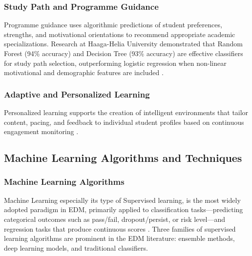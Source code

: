 \documentclass[12pt]{report}
\begin{document}
\subsubsection{Study Path and Programme Guidance}
Programme guidance uses algorithmic predictions of student preferences,
strengths, and motivational orientations to recommend appropriate academic
specializations. Research at Haaga-Helia University demonstrated that
Random Forest (94\% accuracy) and Decision Tree (93\% accuracy) are
effective classifiers for study path selection, outperforming logistic
regression when non-linear motivational and demographic features are
included \parencite{Dirin2022}.

\subsubsection{Adaptive and Personalized Learning}
Personalized learning supports the creation of intelligent environments
that tailor content, pacing, and feedback to individual student profiles
based on continuous engagement monitoring \parencite{kwakye2025}.

\subsection{Machine Learning Algorithms and Techniques}

\subsubsection{Machine Learning Algorithms}
Machine Learning especially its type of Supervised learning,
is the most widely adopted paradigm in EDM,
primarily applied to classification tasks---predicting categorical
outcomes such as pass/fail, dropout/persist, or risk level---and
regression tasks that produce continuous scores \parencite{bello2025,
Dirin2022}. Three families of supervised learning algorithms are
prominent in the EDM literature: ensemble methods, deep learning
models, and traditional classifiers.
\end{document}
